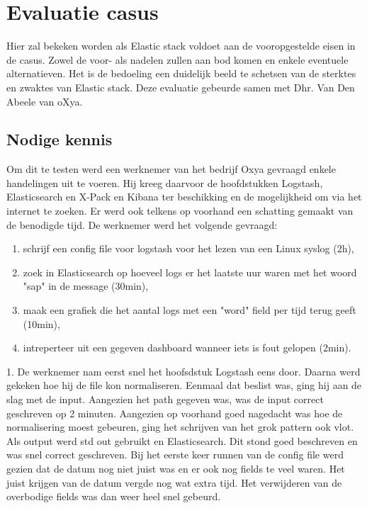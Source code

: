 
\chapter{Evaluatie casus}
\label{ch:evaluatie-casus}

Hier zal bekeken worden als Elastic stack voldoet aan de vooropgestelde eisen in de casus.
Zowel de voor- als nadelen zullen aan bod komen en enkele eventuele alternatieven. Het is de bedoeling een duidelijk beeld te schetsen van de sterktes en zwaktes van Elastic stack.
Deze evaluatie gebeurde samen met Dhr. Van Den Abeele van oXya.

\section{Nodige kennis}
\label{sec:nodige-kennis}
	
Om dit te testen werd een werknemer van het bedrijf Oxya gevraagd enkele handelingen uit te voeren.
Hij kreeg daarvoor de hoofdstukken Logstash, Elasticsearch en X-Pack en Kibana ter beschikking en de mogelijkheid om via het internet te zoeken. 
Er werd ook telkens op voorhand een schatting gemaakt van de benodigde tijd.
De werknemer werd het volgende gevraagd:
\begin{enumerate}
    \item schrijf een config file voor logstash voor het lezen van een Linux syslog (2h),
    \item zoek in Elasticsearch op hoeveel logs er het laatste uur waren met het woord "sap"  in de message (30min),
    \item maak een grafiek die het aantal logs met een "word" field per tijd terug geeft (10min),
	\item intreperteer uit een gegeven dashboard wanneer iets is fout gelopen (2min). 
\end{enumerate}

1. 	De werknemer nam eerst snel het hoofsdstuk Logstash eens door. Daarna werd gekeken hoe hij de file kon normaliseren. 
Eenmaal dat beslist was, ging hij aan de slag met de input. Aangezien het path gegeven was, was de input correct geschreven op 2 minuten. Aangezien op voorhand goed nagedacht was hoe de normalisering moest gebeuren, ging het schrijven van het grok pattern ook vlot.
Als output werd std out gebruikt en Elasticsearch. Dit stond goed beschreven en was snel correct geschreven. 
Bij het eerste keer runnen van de config file werd gezien dat de datum nog niet juist was en er ook nog fields te veel waren. 
Het juist krijgen van de datum vergde nog wat extra tijd. Het verwijderen van de overbodige fields was dan weer heel snel gebeurd.

